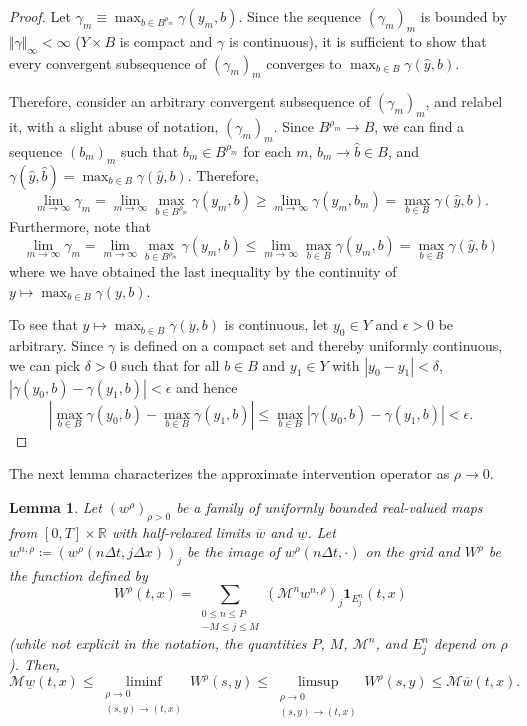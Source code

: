 \documentclass[12pt]{article}
\newcounter{dummy}
\newtheorem{lemma}[dummy]{Lemma}
\begin{document}
\begin{proof}
Let $\gamma_{m}\equiv\max_{b\in B^{\rho_{m}}}\gamma(y_{m},b)$. Since
the sequence $(\gamma_{m})_{m}$ is bounded by $\Vert\gamma\Vert_{\infty}<\infty$
($Y\times B$ is compact and $\gamma$ is continuous), it is sufficient
to show that every convergent subsequence of $(\gamma_{m})_{m}$ converges
to $\max_{b\in B}\gamma(\hat{y},b)$.

Therefore, consider an arbitrary convergent subsequence of $(\gamma_{m})_{m}$,
and relabel it, with a slight abuse of notation, $(\gamma_{m})_{m}$.
 Since $B^{\rho_{m}}\rightarrow B$, we can find a sequence $(b_{m})_{m}$
such that $b_{m}\in B^{\rho_{m}}$ for each $m$, $b_{m}\rightarrow\hat{b}\in B$,
and $\gamma(\hat{y},\hat{b})=\max_{b\in B}\gamma(\hat{y},b)$. Therefore,
\[
\lim_{m\rightarrow\infty}\gamma_{m}=\lim_{m\rightarrow\infty}\max_{b\in B^{\rho_{m}}}\gamma(y_{m},b){\geqslant}\lim_{m\rightarrow\infty}\gamma(y_{m},b_{m})=\max_{b\in B}\gamma(\hat{y},b).
\]
Furthermore, note that
\[
\lim_{m\rightarrow\infty}\gamma_{m}=\lim_{m\rightarrow\infty}\max_{b\in B^{\rho_{m}}}\gamma(y_{m},b){\leqslant}\lim_{m\rightarrow\infty}\max_{b\in B}\gamma(y_{m},b)=\max_{b\in B}\gamma(\hat{y},b)
\]
where we have obtained the last inequality by the continuity
of $y\mapsto\max_{b\in B}\gamma(y,b)$.

To see that $y\mapsto\max_{b\in B}\gamma(y,b)$ is continuous, let
$y_{0}\in Y$ and $\epsilon>0$ be arbitrary. Since $\gamma$ is defined
on a compact set and thereby uniformly continuous, we can pick $\delta>0$
such that for all $b\in B$ and $y_{1}\in Y$ with $|y_{0}-y_{1}|<\delta$,
$|\gamma(y_{0},b)-\gamma(y_{1},b)|<\epsilon$ and hence
\[
\left|\max_{b\in B}\gamma(y_{0},b)-\max_{b\in B}\gamma(y_{1},b)\right|{\leqslant}\max_{b\in B}\left|\gamma(y_{0},b)-\gamma(y_{1},b)\right|<\epsilon.{}
\]
\end{proof}
The next lemma characterizes the approximate intervention operator
as $\rho\rightarrow0$.
\begin{lemma}
\label{lem:intervention_limits}Let $(w^{\rho})_{\rho>0}$ be a family
of uniformly bounded real-valued maps from $[0,T]\times\mathbb{R}$
with half-relaxed limits $\overline{w}$ and $\underline{w}$. Let
$w^{n,\rho}\coloneqq(w^{\rho}(n\Delta t,j\Delta x))_{j}$ be the image
of $w^{\rho}(n\Delta t,\cdot)$ on the grid and $W^{\rho}$ be the
function defined by
\begin{equation}
W^{\rho}(t,x)=\sum_{\substack{0{\leqslant} n{\leqslant} P\\
-M{\leqslant} j{\leqslant} M
}
}(\mathcal{M}^{n}w^{n,\rho})_{j}\mathbf{1}_{E_{j}^{n}}(t,x)\label{eq:W}
\end{equation}
(while not explicit in the notation, the quantities $P$, $M$, $\mathcal{M}^{n}$,
and $E_{j}^{n}$ depend on $\rho$). Then,
\[
\mathcal{M}\underline{w}(t,x){\leqslant}\liminf_{\substack{\rho\rightarrow0\\
(s,y)\rightarrow(t,x)
}
}W^{\rho}(s,y){\leqslant}\limsup_{\substack{\rho\rightarrow0\\
(s,y)\rightarrow(t,x)
}
}W^{\rho}(s,y){\leqslant}\mathcal{M}\overline{w}(t,x).
\]
\end{lemma}
\end{document}
